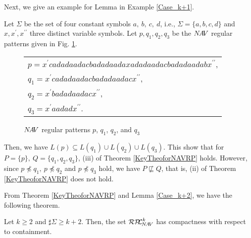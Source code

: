 Next, we give an example for Lemma \label{Case_k+2} in Example \ref{Case_k+1}.
\begin{ex}\label{Case_k+1}\label{反例k+1}
Let $\Sigma$ be the set of four constant symbols $a,~b,~c,~d$, i.e., $\Sigma= \{a, b, c, d \}$ and $x,x^{\prime},x^{\prime\prime}$ three distinct variable symbols.
Let $p,q_{1},q_{2},q_{3}$ be the $N\!A\!V$ regular patterns given in Fig. \ref{Fig:CounterExampleforNAVR}. 
\begin{figure}[tb]
  \begin{tabular}{l}
$p  = x^{\prime}cadadaadacbadadaadaxadadaadacbadadaadabx^{\prime\prime}$,\\
$q_{1} = x^{\prime}cadadaadacbadadaadacx^{\prime\prime}$,\\
$q_{2} = x^{\prime}badadaadacx^{\prime\prime}$,\\
$q_{3} = x^{\prime}aadadx^{\prime\prime}$.
  \end{tabular}
\caption{$N\!A\!V$ regular patterns $p$, $q_{1}$, $q_{2}$, and $q_{3}$}\label{Fig:CounterExampleforNAVR}
\end{figure}
\noindent
Then, we have  $L(p) \subseteq L(q_{1}) \cup L(q_{2}) \cup L(q_{3})$.
This show that for $P=\{p\},~Q=\{q_{1},q_{2},q_{3}\}$, (iii) of Theorem \ref{KeyTheoforNAVRP} holds.
However, since $p \not \preceq q_{1},~p \not \preceq q_{2}$ and $p \not \preceq q_{3}$ hold,
we have $P \not \sqsubseteq Q$, that is, (ii) of Theorem \ref{KeyTheoforNAVRP} does not hold.
\end{ex}

From Theorem \ref{KeyTheoforNAVRP} and Lemma \ref{Case_k+2}, we have the following theorem.

\begin{thm}\label{MainTheforNAVRP}
Let $k\ge 2$ and $\sharp\Sigma \ge k+2$.
Then, the set $\mathcal{RP\!\!L}^{k}_{\!N\!A\!V}$ has compactness with respect to containment.
\end{thm}